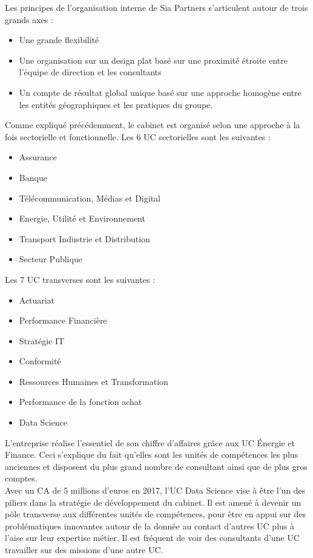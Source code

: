 \documentclass{article} %
\begin{document}
Les principes de l'organisation interne de Sia Partners s'articulent autour de trois grands axes : 
\begin{itemize}
	\item Une grande flexibilité
	\item Une organisation sur un design plat basé sur une proximité étroite entre l’équipe de direction et les consultants
	\item Un compte de résultat global unique basé sur une approche homogène entre les entités géographiques et les pratiques du groupe.
\end{itemize}
Comme expliqué précédemment, le cabinet est organisé selon une approche à la fois sectorielle et fonctionnelle. Les 6 UC sectorielles sont les suivantes :  
\begin{itemize}
	\item Assurance
	\item Banque
	\item Télécommunication, Médias et Digital
	\item Energie, Utilité et Environnement
	\item Transport Industrie et Distribution
	\item Secteur Publique
\end{itemize}
Les 7 UC transverses sont les suivantes : 
\begin{itemize}
	\item Actuariat
	\item Performance Financière
	\item Stratégie IT
	\item Conformité
	\item Ressources Humaines et Transformation
	\item Performance de la fonction achat
	\item Data Science
\end{itemize}
L’entreprise réalise l’essentiel de son chiffre d’affaires grâce aux UC Énergie et Finance. Ceci s’explique du fait qu’elles sont les unités de compétences les plus anciennes et disposent du plus grand nombre de consultant ainsi que de plus gros comptes. \\

Avec un CA de 5 millions d’euros en 2017, l’UC Data Science vise à être l’un des piliers dans la stratégie de développement du cabinet. Il est amené à devenir un pôle transverse aux différentes unités de compétences, pour être en appui sur des problématiques innovantes autour de la donnée au contact d’autres UC plus à l’aise sur leur expertise métier. Il est fréquent de voir des consultants d’une UC travailler sur des missions d’une autre UC. \\
\end{document}
